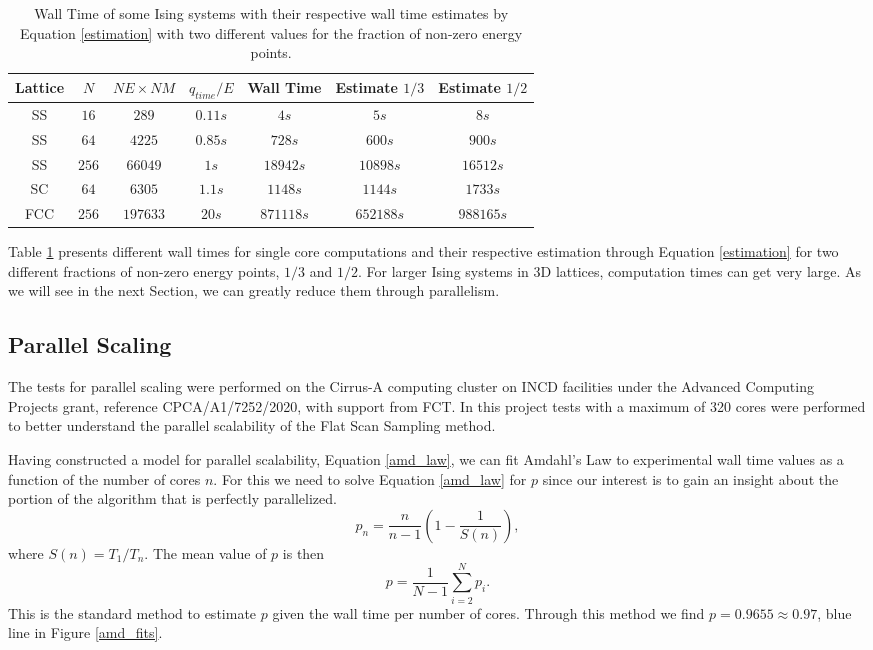 \begin{table}[h]
\centering
\caption{Wall Time of some Ising systems with their respective wall time estimates by Equation \ref{estimation} with two different values for the fraction of non-zero energy points.} 
\begin{tabular}{c|c|c|c|c|c|c}
Lattice & $N$   & $NE \times NM$ & $q_{time}/E$ & Wall Time & Estimate $1/3$ & Estimate $1/2$ \\ \hline
SS      & $16$  & $289$                         & $0.11s $        & $4s$        &$ 5s$                  & $8s$                  \\
SS      & $64$  & $4225$                        & $0.85s$         & $728s$      & $600s $               & $900s    $ \\
SS      & $256$ & $66049$                       & $1s$            & $18942s$    & $10898s $             & $16512s  $ \\
SC      & $64$  & $6305$                        & $1.1s $         & $1148s$     & $1144s$              & $1733s $           \\
FCC     & $256$ & $197633$                      & $20s$           &$ 871118s$   & $652188s$      & $988165s$            
\end{tabular}
\label{wall_time_table}
\end{table}

	Table \ref{wall_time_table} presents different wall times for single core computations and their respective estimation through Equation \ref{estimation} for two different fractions of non-zero energy points, $1/3$ and $1/2$. For larger Ising systems in 3D lattices, computation times can get very large. As we will see in the next Section, we can greatly reduce them through parallelism. 


\subsection{Parallel Scaling}
	
	The tests for parallel scaling were performed on the Cirrus-A computing cluster on INCD facilities under the Advanced Computing Projects grant, reference CPCA/A1/7252/2020, with support from FCT. In this project tests with a maximum of 320 cores were performed to better understand the parallel scalability of the Flat Scan Sampling method.

	Having constructed a model for parallel scalability, Equation \ref{amd_law}, we can fit Amdahl's Law to experimental wall time values as a function of the number of cores $n$. For this we need to solve Equation \ref{amd_law} for $p$ since our interest is to gain an insight about the portion of the algorithm that is perfectly parallelized.
\begin{equation}
	p_n = \frac{n}{n-1} \left( 1 - \frac{1}{S(n)} \right),
\end{equation}
where $S(n) = T_1 / T_n$. The mean value of $p$ is then
\begin{equation}
	p = \frac{1}{N-1} \sum_{i=2}^{N} p_i.
\end{equation}
This is the standard method to estimate $p$ given the wall time per number of cores. Through this method we find  $p=0.9655\approx 0.97$, blue line in Figure \ref{amd_fits}.

